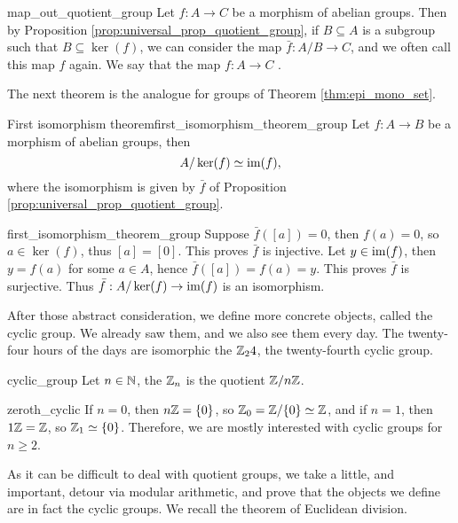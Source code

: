 \begin{crem}{}{map_out_quotient_group}
    Let \( f : A \to C \) be a morphism of abelian groups. Then by Proposition \ref{prop:universal_prop_quotient_group}, if \( B \subseteq A \) is a subgroup such that \( B \subseteq \ker(f) \), we can consider the map \( \bar f : A / B \to C \), and we often call this map \( f \) again. We say that the map \( f : A \to C \) .    
\end{crem}
The next theorem is the analogue for groups of Theorem \ref{thm:epi_mono_set}.
\begin{cthm}{First isomorphism theorem}{first_isomorphism_theorem_group}
    Let \( f : A \to B \) be a morphism of abelian groups, then
    \begin{equation*}
        A / \ker(f) \simeq \operatorname{im}(f),
    \end{equation*}
    where the isomorphism is given by \( \bar f \) of Proposition \ref{prop:universal_prop_quotient_group}.
\end{cthm}
\begin{thmproof}{first_isomorphism_theorem_group}
    Suppose \( \bar f([a]) = 0 \), then \( f(a) = 0 \), so \( a \in \ker(f) \), thus \( [a] = [0] \). This proves \( \bar f \) is injective. Let \( y \in \operatorname{im}(f) \), then \( y = f(a) \) for some \( a \in A \), hence \( \bar f([a]) = f(a) = y \). This proves \( \bar f \) is surjective. Thus \( \bar f : A / \ker(f) \to \operatorname{im}(f) \) is an isomorphism. 
\end{thmproof}

After those abstract consideration, we define more concrete objects, called the cyclic group. We already saw them, and we also see them every day. The twenty-four hours of the days are isomorphic the \( \mathbb{Z}_24 \), the twenty-fourth cyclic group.

\begin{cdef}{}{cyclic_group}
    Let \( n \in \mathbb{N} \), the  \( \mathbb{Z}_n \) is the quotient \( \mathbb{Z} / n\mathbb{Z} \).
\end{cdef}

\begin{crem}{}{zeroth_cyclic}
    If \( n = 0 \), then \( n\mathbb{Z} = \{ 0 \} \), so \( \mathbb{Z}_0 = \mathbb{Z} / \{0 \} \simeq \mathbb{Z} \), and if \( n = 1 \), then \( 1\mathbb{Z} = \mathbb{Z} \), so \( \mathbb{Z}_1 \simeq \{ 0 \} \). Therefore, we are mostly interested with cyclic groups for \( n \geq 2 \). 
\end{crem}
    
As it can be difficult to deal with quotient groups, we take a little, and important, detour via modular arithmetic, and prove that the objects we define are in fact the cyclic groups. We recall the theorem of Euclidean division. 

